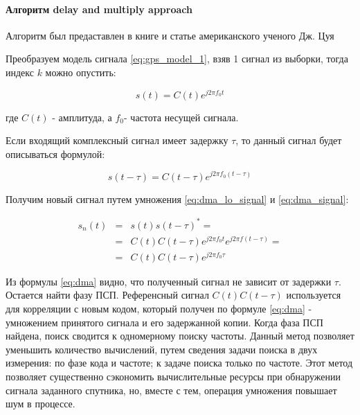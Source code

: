 \paragraph{Алгоритм delay and multiply approach}
\label{ssec:dma}

Алгоритм был предаставлен в книге и статье американского ученого Дж.
Цуя \cite{lin_dma, tsui}

Преобразуем модель сигнала \ref{eq:gps_model_1}, взяв 1 сигнал из выборки, тогда индекс $k$ можно опустить:
\begin{center}
\begin{equation}
	\label{eq:dma_lo_signal}
	s(t)=C(t)e^{j2{\pi}f_{0}t}
\end{equation}
\end{center}
где $C(t)$ - амплитуда, а $f_{0}$- частота несущей сигнала.

Если входящий комплексный сигнал имеет задержку $\tau$, то данный
сигнал будет описываться формулой: 

\begin{center}
\begin{equation}
	\label{eq:dma_signal}
	s(t-\tau)=C(t-\tau)e^{j2{\pi}f_{0}(t-\tau)}
\end{equation}
\end{center}

Получим новый сигнал путем умножения \ref{eq:dma_lo_signal} и \ref{eq:dma_signal}:

\begin{center}
\begin{eqnarray}
	s_{n}(t) & = & s(t)s(t-\tau)^{*}=\nonumber \\
	 & = & C(t)C(t-\tau)e^{j2\pi f_{0}t}e^{j2\pi f(t-\tau)}=\label{eq:dma}\\
	 & = & C(t)C(t-\tau)e^{j2\pi f_{0}\tau}\nonumber 
\end{eqnarray}

\par\end{center}

Из формулы \ref{eq:dma} видно, что полученный сигнал не зависит от
задержки $\tau$. Остается найти фазу ПСП. Референсный сигнал
$C(t)C(t-\tau)$ используется для корреляции с новым кодом, который
получен по формуле \ref{eq:dma} - умножением принятого сигнала и его задержанной
копии. Когда фаза ПСП найдена, поиск сводится к одномерному поиску
частоты. Данный метод позволяет уменьшить количество вычислений, путем
сведения задачи поиска в двух измерения: по фазе кода и частоте; к
задаче поиска только по частоте. Этот метод позволяет существенно
сэкономить вычислительные ресурсы при обнаружении сигнала заданного
спутника, но, вместе с тем, операция умножения повышает шум в процессе.

